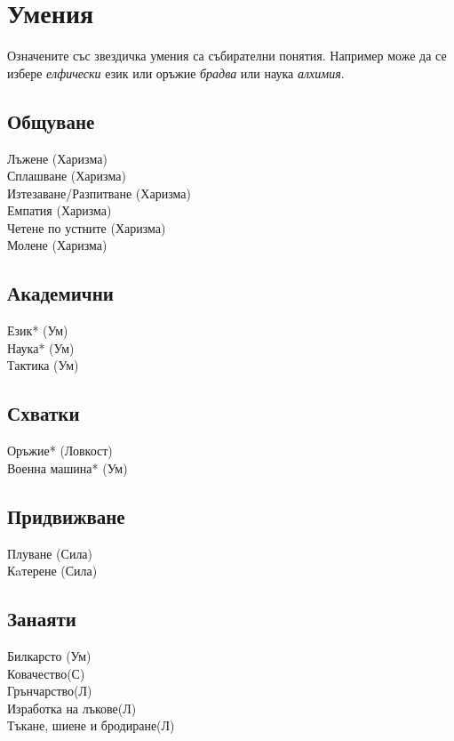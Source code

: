 \chapter{Умения}
Означените със звездичка умения са събирателни понятия.
Например може да се избере \textit{елфически} език или оръжие \textit{брадва} или наука \textit{алхимия}.
\section{Общуване}
Лъжене (Харизма)                  \\
Сплашване (Харизма)               \\
Изтезаване/Разпитване (Харизма)   \\
Емпатия (Харизма)                 \\
Четене по устните (Харизма)       \\
Молене (Харизма)                  \\

\section{Академични}
Език* (Ум)                        \\
Наука* (Ум)                       \\
Тактика (Ум)                      \\

\section{Схватки}
Оръжие* (Ловкост)                 \\
Военна машина* (Ум)               \\

\section{Придвижване}
Плуване (Сила)                    \\
Кaтерене (Сила)                   \\

\section{Занаяти}
Билкарсто (Ум)                    \\
Ковачество(С)                     \\
Грънчарство(Л)                    \\
Изработка на лъкове(Л)            \\
Тъкане, шиене и бродиране(Л)      \\

